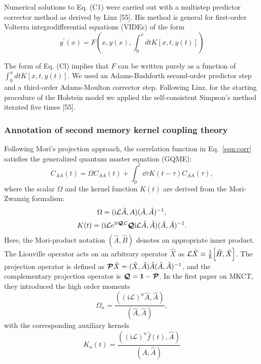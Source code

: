 Numerical solutions to Eq. (C1) were carried out with a multistep predictor corrector method as derived by Linz [55]. His method is general for first-order Volterra integrodifferential equations (VIDEs) of the form
$$
y^{\prime}(x)=F\left(x, y(x), \int_0^x d t K[x, t, y(t)]\right)
$$

The form of Eq. (Cl) implies that $F$ can be written purely as a function of $\int_0^x d t K[x, t, y(t)]$. We used an Adams-Bashforth second-order predictor step and a third-order Adams-Moulton corrector step. Following Linz, for the starting procedure of the Holstein model we applied the self-consistent Simpson's method iterated five times [55].
\subsubsection{Annotation of second memory kernel coupling theory}
Following Mori's projection approach, \cite{mori1965projection} the correlation function in Eq.~\ref{eqn:corr} satisfies the generalized quantum master equation (GQME):  
\begin{equation}
    \dot{C}_{AA}(t) = \Omega C_{AA}(t) + \int_{0}^{t} \dd{\tau} K(t - \tau) C_{AA}(\tau), 
\end{equation}
where the scalar $\Omega$ and the kernel function $K(t)$ are derived from the Mori-Zwanzig formalism:
\begin{equation}
    \Omega = (\textup{i} \mathcal{L} \hat{A}, A) (\hat{A}, \hat{A})^{-1},
\end{equation}
\begin{equation}
    K(t) = (\textup{i} \mathcal{L} e^{\textup{i} t \bm{\mathcal{Q}} \mathcal{L}} \bm{\mathcal{Q}} \textup{i} \mathcal{L} \hat{A}, \hat{A}) (\hat{A}, \hat{A})^{-1}.
\end{equation}
Here, the Mori-product notation $(\hat{A}, \hat{B})$ denotes an appropriate inner product. The Liouville operator acts on an arbitrary operator $\hat{X}$ as $\Lv \hat{X} \equiv \frac{1}{\hbar} \comm{\hat{H}}{\hat{X}}$. The projection operator is defined as $\bm{\mathcal{P}} \hat{X} = (\hat{X}, \hat{A}) \hat{A} (\hat{A}, \hat{A})^{-1}$, and the complementary projection operator is $\bm{\mathcal{Q}} = \bm{1} - \bm{\mathcal{P}}$. In the first paper on MKCT, they introduced the high order moments
\begin{equation}
\Omega_n=\frac{\left((\mathrm{i} \mathcal{L})^n \hat{A}, \hat{A}\right)}{(\hat{A}, \hat{A})},
\end{equation}
with the corresponding auxiliary kernels
\begin{equation}
K_n(t)=\frac{\left((\mathrm{i} \mathcal{L})^n \hat{f}(t), \hat{A}\right)}{(\hat{A}, \hat{A})}
\end{equation}
